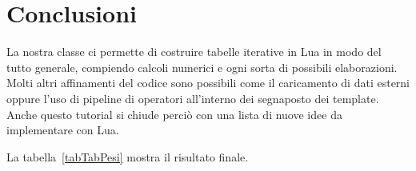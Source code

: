 \section{Conclusioni}

La nostra classe  ci permette di costruire tabelle iterative in Lua in
modo del tutto generale, compiendo calcoli numerici e ogni sorta di possibili
elaborazioni. Molti altri affinamenti del codice sono possibili come il
caricamento di dati esterni oppure l'uso di pipeline di operatori all'interno
dei segnaposto dei template. Anche questo tutorial si chiude perciò con una
lista di nuove idee da implementare con Lua.

La tabella~\ref{tabTabPesi} mostra il risultato finale.

